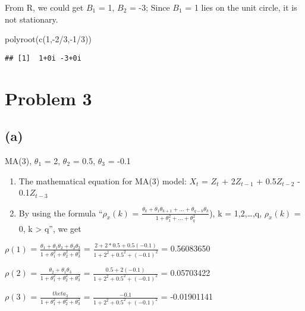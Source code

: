 \documentclass[
]{article}
\newenvironment{Shaded}{\begin{snugshade}}{\end{snugshade}}
\newcommand{\DecValTok}[1]{\textcolor[rgb]{0.00,0.00,0.81}{#1}}
\newcommand{\FunctionTok}[1]{\textcolor[rgb]{0.00,0.00,0.00}{#1}}
\newcommand{\NormalTok}[1]{#1}
\newcommand{\SpecialCharTok}[1]{\textcolor[rgb]{0.00,0.00,0.00}{#1}}
\begin{document}
From R, we could get \(B_1\) = 1, \(B_2\) = -3; Since \(B_1\) = 1 lies
on the unit circle, it is not stationary.

\begin{Shaded}
\begin{Highlighting}[]
\FunctionTok{polyroot}\NormalTok{(}\FunctionTok{c}\NormalTok{(}\DecValTok{1}\NormalTok{,}\SpecialCharTok{{-}}\DecValTok{2}\SpecialCharTok{/}\DecValTok{3}\NormalTok{,}\SpecialCharTok{{-}}\DecValTok{1}\SpecialCharTok{/}\DecValTok{3}\NormalTok{))}
\end{Highlighting}
\end{Shaded}

\begin{verbatim}
## [1]  1+0i -3+0i
\end{verbatim}

\hypertarget{problem-3}{%
\section{Problem 3}\label{problem-3}}

\hypertarget{a-1}{%
\subsection{(a)}\label{a-1}}

MA(3), \(\theta_1\) = 2, \(\theta_2\) = 0.5, \(\theta_3\) = -0.1

\begin{enumerate}
\def\labelenumi{(\arabic{enumi})}
\item
  The mathematical equation for MA(3) model: \(X_t\) = \(Z_t\) +
  2\(Z_{t-1}\) + 0.5\(Z_{t-2}\) - 0.1\(Z_{t-3}\)
\item
  By using the formula ``\(\rho_x(k)\) =
  \(\frac{\theta_k+\theta_1\theta_{k+1}+...+\theta_{q-k}\theta_k}{1+\theta_1^2+...+\theta_q^2}\)),
  k = 1,2,\ldots,q, \(\rho_x(k)\) = 0, k \textgreater{} q'', we get
\end{enumerate}

\(\rho(1)\) =
\(\frac{\theta_1+\theta_1\theta_2+\theta_2\theta_3}{1+\theta_1^2+\theta_2^2+\theta_3^2}\)
= \(\frac{2+2*0.5+0.5(-0.1)}{1+2^2+0.5^2+(-0.1)^2}\) = 0.56083650

\(\rho(2)\) =
\(\frac{\theta_2+\theta_1\theta_3}{1+\theta_1^2+\theta_2^2+\theta_3^2}\)
= \(\frac{0.5+2(-0.1)}{1+2^2+0.5^2+(-0.1)^2}\) = 0.05703422

\(\rho(3)\) = \(\frac{theta_3}{1+\theta_1^2+\theta_2^2+\theta_3^2}\) =
\(\frac{-0.1}{1+2^2+0.5^2+(-0.1)^2}\) = -0.01901141
\end{document}

